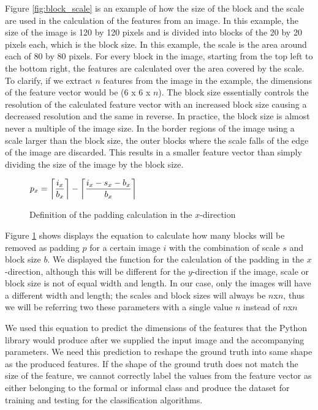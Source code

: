 Figure \ref{fig:block_scale} is an example of how the size of the block and the scale are used in the calculation of the features from an image. In this example, the size of the image is 120 by 120 pixels and is divided into blocks of the 20 by 20 pixels each, which is the block size. In this example, the scale is the area around each of 80 by 80 pixels. For every block in the image, starting from the top left to the bottom right, the features are calculated over the area covered by the scale. To clarify, if we extract $n$ features from the image in the example, the dimensions of the feature vector would be (6 x 6 x $n$). The block size essentially controls the resolution of the calculated feature vector with an increased block size causing a decreased resolution and the same in reverse. In practice, the block size is almost never a multiple of the image size. In the border regions of the image using a scale larger than the block size, the outer blocks where the scale falls of the edge of the image are discarded. This results in a smaller feature vector than simply dividing the size of the image by the block size.

\begin{figure}[h]
	\centering
	$\mathlarger{ p_x = \ceil*{\frac{i_x}{b_x}} - \ceil*{\frac{i_x - s_x - b_x}{b_x}} }$
	\caption{Definition of the padding calculation in the $x$-direction}
	\label{padding}
\end{figure}

Figure \ref{padding} shows displays the equation to calculate how many blocks will be removed as padding $p$ for a certain image $i$ with the combination of scale $s$ and block size $b$. We displayed the function for the calculation of the padding in the $x$-direction, although this will be different for the $y$-direction if the image, scale or block size is not of equal width and length. In our case, only the images will have a different width and length; the scales and block sizes will always be $n$x$n$, thus we will be referring two these parameters with a single value $n$ instead of $n$x$n$

We used this equation to predict the dimensions of the features that the Python library would produce after we supplied the input image and the accompanying parameters. We need this prediction to reshape the ground truth into same shape as the produced features. If the shape of the ground truth does not match the size of the feature, we cannot correctly label the values from the feature vector as either belonging to the formal or informal class and produce the dataset for training and testing for the classification algorithms.

